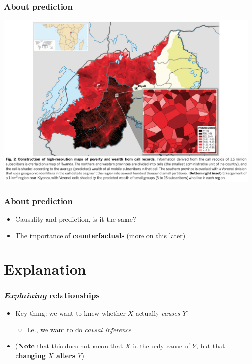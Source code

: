 \documentclass[aspectratio=43]{beamer}
\begin{document}
\begin{frame}
\frametitle{About prediction}
\centering

\includegraphics[width = \textwidth]{../img/blumenstock3}

\end{frame}

\begin{frame}
\frametitle{About prediction}
\centering

\begin{itemize}[<+->]
  \item Causality and prediction, is it the same?
  \item The importance of \textbf{counterfactuals} (more on this later)
\end{itemize}

\end{frame}

\section{Explanation}

\begin{frame}
\frametitle{\textit{Explaining} relationships}
\centering

\begin{itemize}[<+->]
  \item Key thing: we want to know whether $X$ actually \textit{causes} $Y$
  \begin{itemize}
    \item I.e., we want to do \textit{causal inference}
  \end{itemize}
  \item (\textbf{Note} that this does not mean that $X$ is the only cause of $Y$, but that \textbf{changing $X$ alters $Y$})
\end{itemize}

\end{frame}
\end{document}
